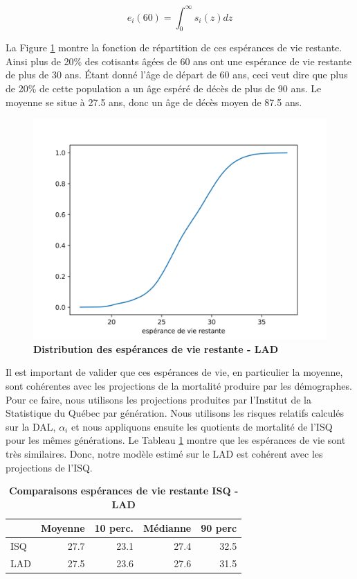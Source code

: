 \documentclass[french, 12pt]{article}
\begin{document}
	$$ e_{i}(60) = \int_0^{\infty} s_i(z)dz $$
	
	La Figure \ref{fig:ex} montre la fonction de répartition de ces espérances de vie restante. Ainsi plus de 20\% des cotisants âgées de 60 ans ont une espérance de vie restante de plus de 30 ans. Étant donné l'âge de départ de 60 ans, ceci veut dire que plus de 20\% de cette population a un âge espéré de décès de plus de 90 ans. Le moyenne se situe à 27.5 ans, donc un âge de décès moyen de 87.5 ans. 
	
	\begin{figure}[!htbp]
		\centering 
		\includegraphics[scale=0.75]{../figures/ex.png}
		\caption{\textbf{Distribution des espérances de vie restante - LAD}}
		\label{fig:ex}
	\end{figure}
	
	Il est important de valider que ces espérances de vie, en particulier la moyenne, sont cohérentes avec les projections de la mortalité produire par les démographes. Pour ce faire, nous utilisons les projections produites par l'Institut de la Statistique du Québec par génération. Nous utilisons les risques relatifs calculés sur la DAL, $\alpha_i$ et nous appliquons ensuite les quotients de mortalité de l'ISQ pour les mêmes générations. Le Tableau \ref{tab:compare} montre que les espérances de vie sont très similaires. Donc, notre modèle estimé sur le LAD est cohérent avec les projections de l'ISQ. 
	
	\begin{table}[!htbp]
		\centering
		\begin{tabular}{lrrrr}
			\toprule 
				& Moyenne & 10 perc. & Médianne & 90 perc \\
			\midrule
			ISQ & 27.7 & 23.1 & 27.4 & 32.5 \\
			LAD & 27.5 & 23.6 & 27.6 & 31.5 \\
			\bottomrule
		\end{tabular}
		\caption{\textbf{Comparaisons espérances de vie restante ISQ - LAD}}
		\label{tab:compare}
	\end{table}
	
\end{document}
